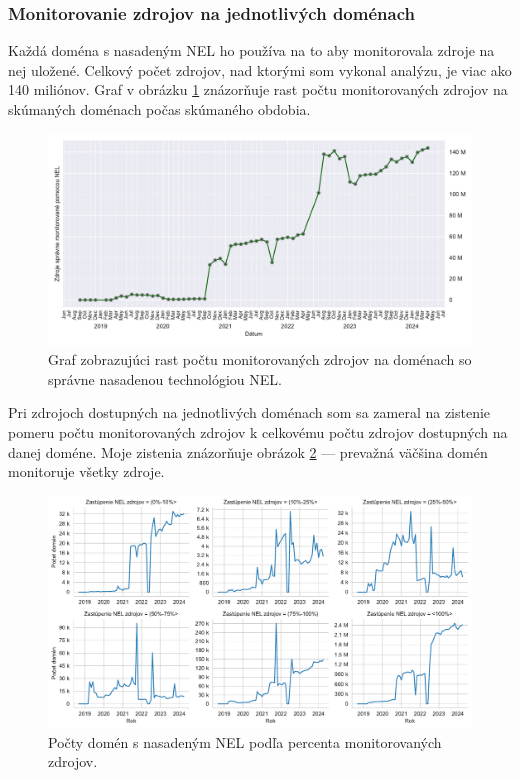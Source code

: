 \subsubsection{Monitorovanie zdrojov na jednotlivých doménach}

Každá doména s nasadeným NEL ho používa na to aby monitorovala zdroje na nej uložené.
Celkový počet zdrojov, nad ktorými som vykonal analýzu, je viac ako 140 miliónov.
Graf v obrázku \ref{fig:httparchive-nel-deployment-resources} znázorňuje rast počtu monitorovaných zdrojov na skúmaných doménach počas skúmaného obdobia.

\begin{figure}[!htb]
\begin{center}
 \includegraphics[scale=0.59]{obrazky-figures/httparchive_nel_deployment_resources.pdf}
 \caption{Graf zobrazujúci rast počtu monitorovaných zdrojov na doménach so správne nasadenou technológiou NEL.}
 \label{fig:httparchive-nel-deployment-resources}
\end{center}
\end{figure}

Pri zdrojoch dostupných na jednotlivých doménach som sa zameral na zistenie pomeru počtu monitorovaných zdrojov k celkovému počtu zdrojov dostupných na danej doméne.
Moje zistenia znázorňuje obrázok \ref{fig:httparchive-nel-monitored-resources-precentage-dist} --- prevažná väčšina domén monitoruje všetky zdroje.

\begin{figure}[!htb]
\begin{center}
 \includegraphics[scale=0.56]{obrazky-figures/httparchive_nel_monitored_resources_percentage_dist.pdf}
 \caption{Počty domén s nasadeným NEL podľa percenta monitorovaných zdrojov.}
 \label{fig:httparchive-nel-monitored-resources-precentage-dist}
\end{center}
\end{figure}

